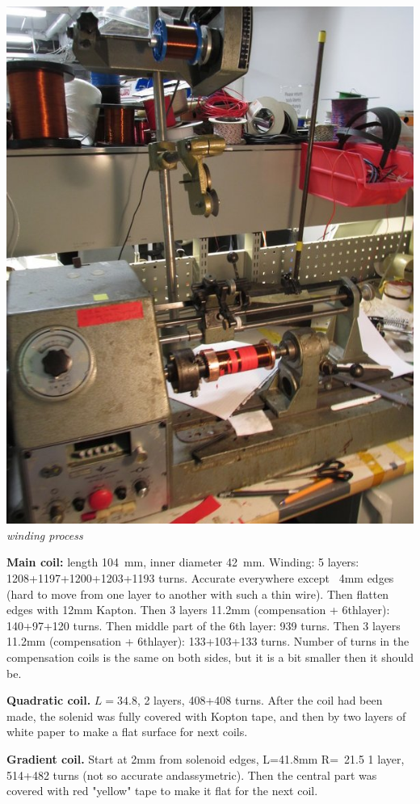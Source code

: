 \documentclass[a4paper]{article}
\begin{document}
\vbox{\noindent
\includegraphics[width=\linewidth]{img/winding.jpg}\\
{\it winding process}}

{\bf Main coil:} length 104~mm, inner diameter 42~mm. Winding:
5 layers: 1208+1197+1200+1203+1193 turns. Accurate everywhere except
~4mm edges (hard to move from one layer to another with such a thin
wire). Then flatten edges with 12mm Kapton. Then 3 layers 11.2mm (compensation + 6thlayer):
140+97+120 turns. Then middle part of the 6th layer: 939 turns. Then
3 layers 11.2mm (compensation + 6thlayer): 133+103+133 turns.
Number of turns in the compensation coils is the same on both sides,
but it is a bit smaller then it should be.


{\bf Quadratic coil.} $L=34.8$, 2 layers, 408+408 turns.
After the coil had been made, the solenid was fully covered with Kopton
tape, and then by two layers of white paper to make a flat surface for
next coils.

{\bf Gradient coil.} Start at 2mm from solenoid edges, L=41.8mm R=~21.5
1 layer, 514+482 turns (not so accurate andassymetric).
Then the central part was covered with red "yellow" tape to make it flat
for the next coil.
\end{document}

